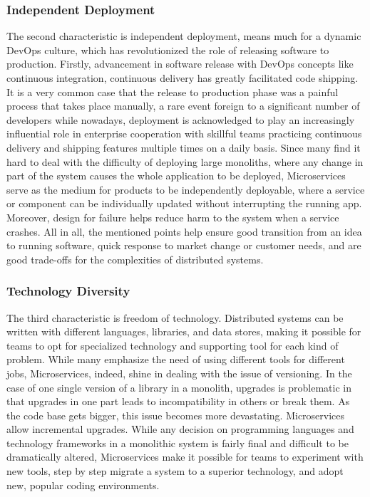\documentclass[a4paper]{book}
\begin{document}
\subsubsection{Independent Deployment}
The second characteristic is independent deployment, means much for a dynamic DevOps \cite{DevOps} culture, which has revolutionized the role of releasing software to production. Firstly, advancement in software release with DevOps concepts like continuous integration, continuous delivery has greatly facilitated code shipping. It is a very common case that the release to production phase was a painful process that takes place manually, a rare event foreign to a significant number of developers while nowadays, deployment is acknowledged to play an increasingly influential role in enterprise cooperation with skillful teams practicing continuous delivery and shipping features multiple times on a daily basis. Since many find it hard to deal with the difficulty of deploying large monoliths, where any change in part of the system causes the whole application to be deployed, Microservices serve as the medium for products to be independently deployable, where a service or component can be individually updated without interrupting the running app. Moreover, design for failure helps reduce harm to the system when a service crashes.  All in all, the mentioned points help ensure good transition from an idea to running software, quick response to market change or customer needs, and are good trade-offs for the complexities of distributed systems. \cite{Lew14, MTO}

\subsubsection{Technology Diversity}
The third characteristic is freedom of technology. Distributed systems can be written with different languages, libraries, and data stores, making it possible for teams to opt for specialized technology and supporting tool for each kind of problem. While many emphasize the need of using different tools for different jobs, Microservices, indeed, shine in dealing with the issue of versioning. In the case of one single version of a library in a monolith, upgrades is problematic in that upgrades in one part leads to incompatibility in others or break them. As the code base gets bigger, this issue becomes more devastating. Microservices allow incremental upgrades. While any decision on programming languages and technology frameworks in a monolithic system is fairly final and difficult to be dramatically altered, Microservices make it possible for teams to experiment with new tools, step by step migrate a system to a superior technology, and adopt new, popular coding environments. \cite{Lew14, MTO} 
\end{document}
